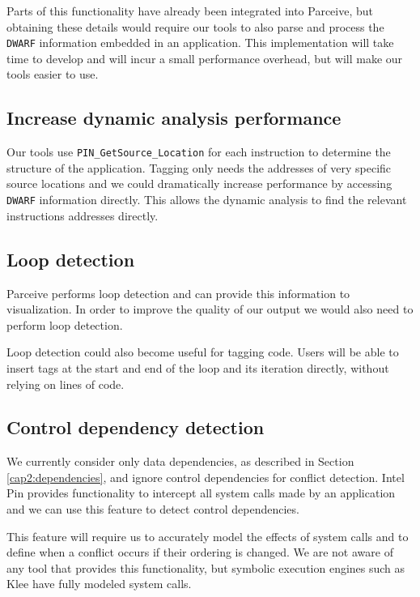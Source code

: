 Parts of this functionality have already been integrated into Parceive, but obtaining these details would require our tools to also parse and process the \texttt{DWARF} information embedded in an application. This implementation will take time to develop and will incur a small performance overhead, but will make our tools easier to use.

\subsection{Increase dynamic analysis performance}

Our tools use \texttt{PIN\_GetSource\_Location} for each instruction to determine the structure of the application. Tagging only needs the addresses of very specific source locations and we could dramatically increase performance by accessing \texttt{DWARF} information directly. This allows the dynamic analysis to find the relevant instructions addresses directly.

\subsection{Loop detection}

Parceive performs loop detection and can provide this information to visualization. In order to improve the quality of our output we would also need to perform loop detection.

Loop detection could also become useful for tagging code. Users will be able to insert tags at the start and end of the loop and its iteration directly, without relying on lines of code.

\subsection{Control dependency detection}

We currently consider only data dependencies, as described in Section \ref{cap2:dependencies}, and ignore control dependencies for conflict detection. Intel Pin provides functionality to intercept all system calls made by an application and we can use this feature to detect  control dependencies.

This feature will require us to accurately model the effects of system calls and to define when a conflict occurs if their ordering is changed. We are not aware of any tool that provides this functionality, but symbolic execution engines such as Klee \cite{klee} have fully modeled system calls.

